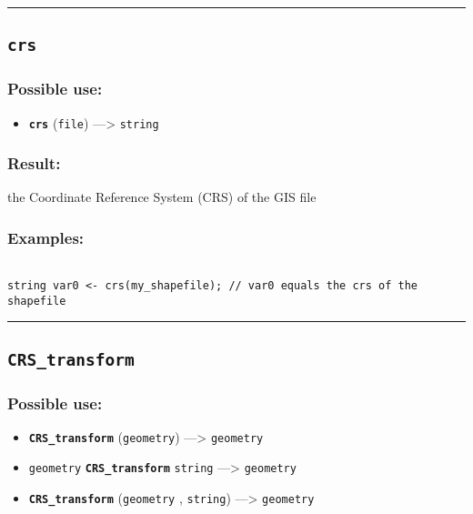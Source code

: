 \documentclass[]{book}
\providecommand{\tightlist}{%
  \setlength{\itemsep}{0pt}\setlength{\parskip}{0pt}}
\theoremstyle{definition}
\theoremstyle{definition}
\theoremstyle{definition}
\theoremstyle{remark}
\begin{document}
\begin{center}\rule{0.5\linewidth}{\linethickness}\end{center}

\subsection{\texorpdfstring{\texttt{crs}}{crs}}\label{crs}

\subsubsection{Possible use:}\label{possible-use-118}

\begin{itemize}
\tightlist
\item
  \textbf{\texttt{crs}} (\texttt{file}) ---\textgreater{}
  \texttt{string}
\end{itemize}

\subsubsection{Result:}\label{result-115}

the Coordinate Reference System (CRS) of the GIS file

\subsubsection{Examples:}\label{examples-90}

\begin{verbatim}
 
string var0 <- crs(my_shapefile); // var0 equals the crs of the shapefile
\end{verbatim}

\begin{center}\rule{0.5\linewidth}{\linethickness}\end{center}

\subsection{\texorpdfstring{\texttt{CRS\_transform}}{CRS\_transform}}\label{crs_transform}

\subsubsection{Possible use:}\label{possible-use-119}

\begin{itemize}
\tightlist
\item
  \textbf{\texttt{CRS\_transform}} (\texttt{geometry}) ---\textgreater{}
  \texttt{geometry}
\item
  \texttt{geometry} \textbf{\texttt{CRS\_transform}} \texttt{string}
  ---\textgreater{} \texttt{geometry}
\item
  \textbf{\texttt{CRS\_transform}} (\texttt{geometry} , \texttt{string})
  ---\textgreater{} \texttt{geometry}
\end{itemize}
\end{document}
